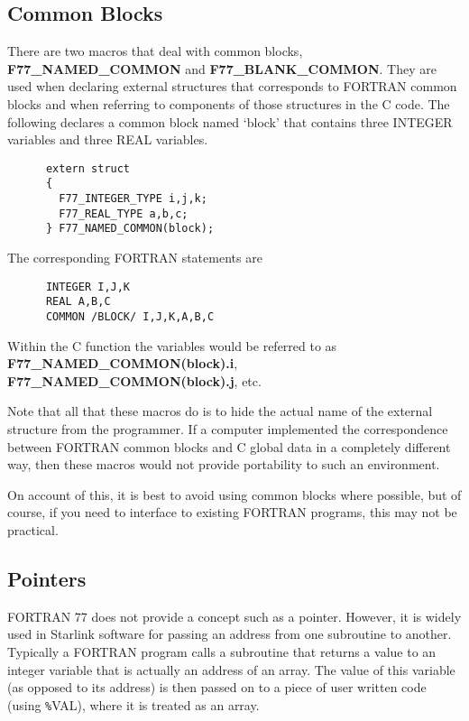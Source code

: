 \subsection{Common Blocks}

There are two macros that deal with common blocks, {\bf F77\_\-NAMED\_\-COMMON}
and {\bf F77\_\-BLANK\_\-COMMON}. They are used when declaring external
structures that corresponds to FORTRAN common blocks and when referring to
components of those structures in the C code. The following declares a common
block named `block' that contains three INTEGER variables and three REAL
variables.

{\small \begin{verbatim}
      extern struct
      {
        F77_INTEGER_TYPE i,j,k;
        F77_REAL_TYPE a,b,c;
      } F77_NAMED_COMMON(block);
\end{verbatim} }

The corresponding FORTRAN statements are

{\small \begin{verbatim}
      INTEGER I,J,K
      REAL A,B,C
      COMMON /BLOCK/ I,J,K,A,B,C
\end{verbatim} }

Within the C function the variables would be referred to as {\bf
F77\_\-NAMED\_\-COMMON(block).i}, {\bf F77\_\-NAMED\_\-COMMON(block).j}, etc. 

Note that all that these macros do is to hide the actual name of the external
structure from the programmer. If a computer implemented the correspondence
between FORTRAN common blocks and C global data in a completely different way,
then these macros would not provide portability to such an environment.

On account of this, it is best to avoid using common blocks where possible, but
of course, if you need to interface to existing FORTRAN programs, this may not
be practical.

\subsection{Pointers}

FORTRAN 77 does not provide a concept such as a pointer. However, it is widely
used in Starlink software for passing an address from one subroutine to
another. Typically a FORTRAN program calls a subroutine that returns a value to
an integer variable that is actually an address of an array. The value of this
variable (as opposed to its address) is then passed on to a piece of user
written code (using {\tt \%}VAL), where it is treated as an array.

